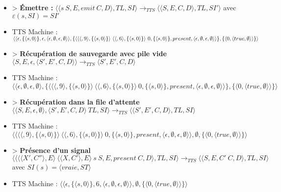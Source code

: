 \documentclass[10pt,a4paper]{article}
\begin{document}
\begin{itemize}
					\item[] > \textbf{Émettre :} 
					$\langle\langle s~S,E,emit~C,D\rangle,TL,SI\rangle 
					\longrightarrow_{TTS}
					\langle\langle S,E,C,D\rangle,TL,SI'\rangle$
					avec $\varepsilon(s,SI) = SI'$
					\item[] TTS Machine : $\langle \langle \epsilon,\{\langle s,0\rangle\},\epsilon,\langle \epsilon,\emptyset,\epsilon,\emptyset\rangle\rangle,\{\langle \langle\langle,9\rangle,\{\langle s,0\rangle\}\rangle~\langle\langle,6\rangle,\{\langle s,0\rangle\}\rangle~0,\{\langle s,0\rangle\},present,\langle \epsilon,\emptyset,\epsilon,\emptyset\rangle\rangle\},\{\langle 0,\langle true,\\\emptyset\rangle\rangle\}\rangle$
					\item[] > \textbf{Récupération de sauvegarde avec pile vide} $\langle S,E,\epsilon,\langle S',E',C,D\rangle\rangle
					\longrightarrow_{TTS} 
					\langle S',E',C,D\rangle$
					\item[] TTS Machine : $\langle \langle \epsilon,\emptyset,\epsilon,\emptyset\rangle,\{\langle \langle\langle,9\rangle,\{\langle s,0\rangle\}\rangle~\langle\langle,6\rangle,\{\langle s,0\rangle\}\rangle~0,\{\langle s,0\rangle\},present,\langle \epsilon,\emptyset,\epsilon,\emptyset\rangle\rangle\},\{\langle 0,\langle true,\emptyset\rangle\rangle\}\rangle$
					\item[] > \textbf{Récupération dans la file d'attente}
					$\langle\langle S,E,\epsilon,\emptyset\rangle,\langle S',E',C,D\rangle~TL,SI\rangle 
					\longrightarrow_{TTS} 
					\langle\langle S',E',C,D\rangle,TL,SI\rangle$
					\item[] TTS Machine : $\langle \langle \langle\langle,9\rangle,\{\langle s,0\rangle\}\rangle~\langle\langle,6\rangle,\{\langle s,0\rangle\}\rangle~0,\{\langle s,0\rangle\},present,\langle \epsilon,\emptyset,\epsilon,\emptyset\rangle\rangle,\emptyset,\{\langle 0,\langle true,\emptyset\rangle\rangle\}\rangle$
					\item[] > \textbf{Présence d'un signal} $\langle\langle \langle\langle X',C''\rangle,E\rangle~\langle\langle X,C'\rangle,E\rangle~s~S,E,present~C,D\rangle,TL,SI\rangle 
					\longrightarrow_{TTS} 
					\langle\langle S,E,C'~C,D\rangle,TL,SI\rangle$ 
					\\avec $SI(s) = \langle vraie,ST\rangle$
					\item[] TTS Machine : $\langle \langle \epsilon,\{\langle s,0\rangle\},6,\langle \epsilon,\emptyset,\epsilon,\emptyset\rangle\rangle,\emptyset,\{\langle 0,\langle true,\emptyset\rangle\rangle\}\rangle$

\end{itemize}
\end{document}
